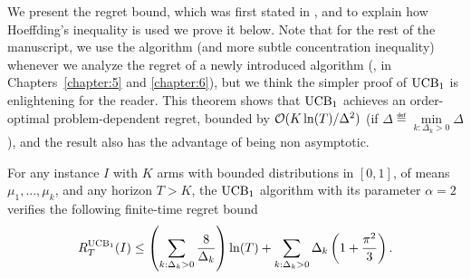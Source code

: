 We present the regret bound, which was first stated in \cite{Auer02}, and to explain how Hoeffding's inequality is used we prove it below.
Note that for the rest of the manuscript, we use the \klUCB{} algorithm (and more subtle concentration inequality) whenever we analyze the regret of a newly introduced algorithm (\ie, in Chapters~\ref{chapter:5} and \ref{chapter:6}),
but we think the simpler proof of $\mathrm{UCB}_1$ is enlightening for the reader.
%
This theorem shows that $\mathrm{UCB}_1$ achieves an order-optimal problem-dependent regret, bounded by $\mathcal{O}(K\ln(T)/\Delta^2)$ (if $\Delta \eqdef \min\limits_{k: \Delta_k>0} \Delta$), and the result also has the advantage of being non asymptotic.

\begin{theorem}\label{thm:2:UCBregretBound}
\begin{leftbar}[theorembar]  %
    For any instance $I$ with $K$ arms with bounded distributions in $[0,1]$,
    of means $\mu_1,\dots,\mu_k$, and any horizon $T>K$,
    the $\mathrm{UCB}_1$ algorithm with its parameter\footnotemark{} $\alpha=2$ verifies the following finite-time regret bound
    \begin{equation}\label{eq:2:UCBregretBound}
        R_T^{\mathrm{UCB}_1}(I) \leq \left(\sum_{k: \Delta_k>0} \frac{8}{\Delta_k}\right) \ln(T) + \sum_{k: \Delta_k>0} \Delta_k \left(1 + \frac{\pi^2}{3}\right).
    \end{equation}
\end{leftbar}  %
\end{theorem}
%
%
%
